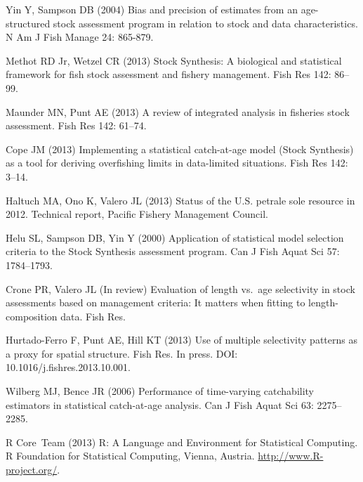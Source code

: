 \documentclass[11pt]{article}
\begin{document}
\begin{spacing}{1.2}
\begin{thebibliography}{10}
Yin Y, Sampson DB (2004) Bias and precision of estimates from an age-structured
  stock assessment program in relation to stock and data characteristics.
\newblock N Am J Fish Manage 24: 865-879.

Methot RD Jr, Wetzel CR (2013) {Stock Synthesis}: A biological and statistical
  framework for fish stock assessment and fishery management.
\newblock Fish Res 142: 86--99.

Maunder MN, Punt AE (2013) A review of integrated analysis in fisheries stock
  assessment.
\newblock Fish Res 142: 61--74.

Cope JM (2013) Implementing a statistical catch-at-age model ({Stock
  Synthesis}) as a tool for deriving overfishing limits in data-limited
  situations.
\newblock Fish Res 142: 3--14.

Haltuch MA, Ono K, Valero JL (2013) Status of the {U.S.} petrale sole resource
  in 2012.
\newblock Technical report, Pacific Fishery Management Council.

Helu SL, Sampson DB, Yin Y (2000) Application of statistical model selection
  criteria to the {Stock Synthesis} assessment program.
\newblock Can J Fish Aquat Sci 57: 1784--1793.

Crone PR, Valero JL (In review) Evaluation of length vs.~age selectivity in
  stock assessments based on management criteria: It matters when fitting to
  length-composition data.
\newblock Fish Res.

Hurtado-Ferro F, Punt AE, Hill KT (2013) Use of multiple selectivity patterns
  as a proxy for spatial structure.
\newblock Fish Res. In press. DOI: 10.1016/j.fishres.2013.10.001.

Wilberg MJ, Bence JR (2006) Performance of time-varying catchability estimators
  in statistical catch-at-age analysis.
\newblock Can J Fish Aquat Sci 63: 2275--2285.

\textsf{R} Core~Team (2013) \textsf{R}: A Language and Environment for
  Statistical Computing.
\newblock \textsf{R} Foundation for Statistical Computing, Vienna, Austria.
\newblock \urlprefix\url{http://www.R-project.org/}.


\end{thebibliography}
\end{spacing}
\end{document}
